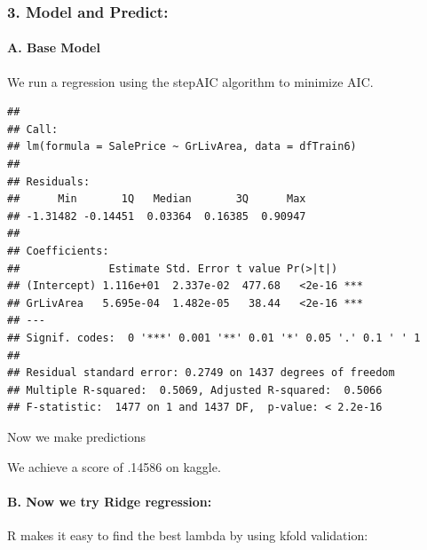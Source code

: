 \documentclass[
]{article}
\begin{document}
\hypertarget{model-and-predict}{%
\subsubsection{3. Model and Predict:}\label{model-and-predict}}

\hypertarget{a.-base-model}{%
\paragraph{A. Base Model}\label{a.-base-model}}

We run a regression using the stepAIC algorithm to minimize AIC.

\begin{verbatim}
## 
## Call:
## lm(formula = SalePrice ~ GrLivArea, data = dfTrain6)
## 
## Residuals:
##      Min       1Q   Median       3Q      Max 
## -1.31482 -0.14451  0.03364  0.16385  0.90947 
## 
## Coefficients:
##              Estimate Std. Error t value Pr(>|t|)    
## (Intercept) 1.116e+01  2.337e-02  477.68   <2e-16 ***
## GrLivArea   5.695e-04  1.482e-05   38.44   <2e-16 ***
## ---
## Signif. codes:  0 '***' 0.001 '**' 0.01 '*' 0.05 '.' 0.1 ' ' 1
## 
## Residual standard error: 0.2749 on 1437 degrees of freedom
## Multiple R-squared:  0.5069, Adjusted R-squared:  0.5066 
## F-statistic:  1477 on 1 and 1437 DF,  p-value: < 2.2e-16
\end{verbatim}

Now we make predictions

We achieve a score of .14586 on kaggle.

\hypertarget{b.-now-we-try-ridge-regression}{%
\paragraph{B. Now we try Ridge
regression:}\label{b.-now-we-try-ridge-regression}}

R makes it easy to find the best lambda by using kfold validation:
\end{document}
